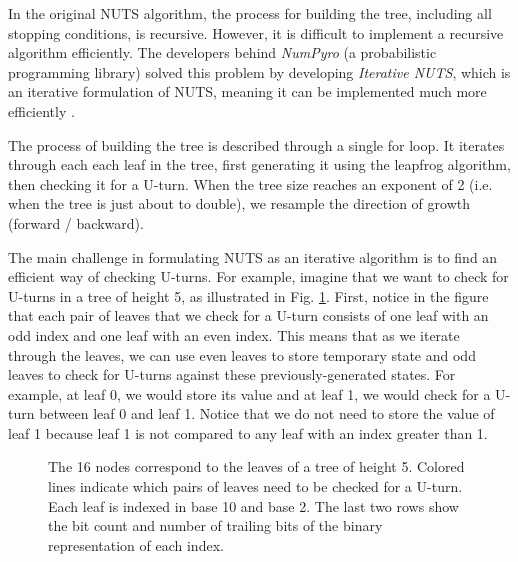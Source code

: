 \documentclass[12pt]{article}
\begin{document}
In the original NUTS algorithm, the process for building the tree, including all stopping conditions, is recursive. However, it is difficult to implement a recursive algorithm efficiently. The developers behind \textit{NumPyro} (a probabilistic programming library) solved this problem by developing \textit{Iterative NUTS}, which is an iterative formulation of NUTS, meaning it can be implemented much more efficiently \cite{numpyro}.

The process of building the tree is described through a single for loop. It iterates through each each leaf in the tree, first generating it using the leapfrog algorithm, then checking it for a U-turn. When the tree size reaches an exponent of 2 (i.e. when the tree is just about to double), we resample the direction of growth (forward / backward).

The main challenge in formulating NUTS as an iterative algorithm is to find an efficient way of checking U-turns. For example, imagine that we want to check for U-turns in a tree of height 5, as illustrated in Fig. \ref{fig_iterative_nuts_indexing}. First, notice in the figure that each pair of leaves that we check for a U-turn consists of one leaf with an odd index and one leaf with an even index. This means that as we iterate through the leaves, we can use even leaves to store temporary state and odd leaves to check for U-turns against these previously-generated states. For example, at leaf 0, we would store its value and at leaf 1, we would check for a U-turn between leaf 0 and leaf 1. Notice that we do not need to store the value of leaf 1 because leaf 1 is not compared to any leaf with an index greater than 1.

\begin{figure}[H]
\centering
{}
\caption{The 16 nodes correspond to the leaves of a tree of height 5. Colored lines indicate which pairs of leaves need to be checked for a U-turn. Each leaf is indexed in base 10 and base 2. The last two rows show the bit count and number of trailing bits of the binary representation of each index.}
\label{fig_iterative_nuts_indexing}
\end{figure}
\end{document}
